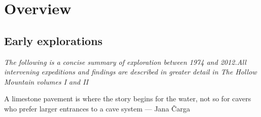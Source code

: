 \chapter{Overview}

\section{Early explorations}
\textit{The following is a concise summary of exploration between 1974 and 2012.All intervening expeditions and findings are described in greater detail in The Hollow Mountain volumes I and II}

	\begin{marginfigure}
    \vspace{-250pt}
	\checkoddpage \ifoddpage \forcerectofloat \else \forceversofloat \fi
	\centering
  	\caption{A limestone pavement is where the story begins for the water, not so for cavers who prefer larger entrances to a cave system --- Jana \v{C}arga}
	\end{marginfigure}

